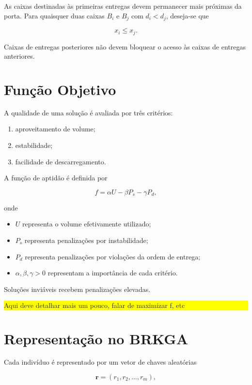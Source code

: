 \documentclass[12pt]{article}
\begin{document}
As caixas destinadas às primeiras entregas devem permanecer mais próximas da porta. Para quaisquer duas caixas $B_i$ e $B_j$ com $d_i < d_j$, deseja-se que

\[
x_i \leq x_j.
\]

Caixas de entregas posteriores não devem bloquear o acesso às caixas de entregas anteriores.

\section{Função Objetivo}

A qualidade de uma solução é avaliada por três critérios:

\begin{enumerate}
\item aproveitamento de volume;
\item estabilidade;
\item facilidade de descarregamento.
\end{enumerate}

A função de aptidão é definida por

\[
f = \alpha U - \beta P_s - \gamma P_d,
\]

onde

\begin{itemize}
\item $U$ representa o volume efetivamente utilizado;
\item $P_s$ representa penalizações por instabilidade;
\item $P_d$ representa penalizações por violações da ordem de entrega;
\item $\alpha,\beta,\gamma > 0$ representam a importância de cada critério.
\end{itemize}

Soluções inviáveis recebem penalizações elevadas.

\colorbox{yellow}{
    \begin{minipage}{0.9\linewidth}
        Aqui deve detalhar mais um pouco, falar de maximizar f, etc
    \end{minipage}
}

\section{Representação no BRKGA}

Cada indivíduo é representado por um vetor de chaves aleatórias

\[
\mathbf{r} = (r_1, r_2, \ldots, r_m),
\]
\end{document}
